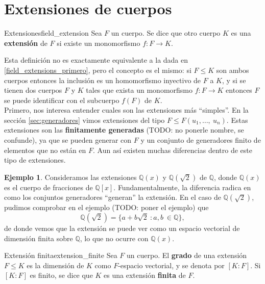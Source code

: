 \documentclass[a4paper]{book}
\theoremstyle{definition}
\theoremstyle{ejemplo}
\newtheorem{ejem}{Ejemplo}[section]
\theoremstyle{demostracion}
\newcommand{\racionales}{\mathbb{Q}}
\begin{document}
\section{Extensiones de cuerpos}
\begin{define}{Extensiones}{field_extension}
	Sea $F$ un cuerpo. Se dice que otro cuerpo $K$ es una \textbf{extensión} de $F$ si existe un monomorfismo $f: F \rightarrow K$.
\end{define}
Esta definición no es exactamente equivalente a la dada en \eqref{field_extensions_primero}, pero el concepto es el mismo: si $F \leq K$ son ambos cuerpos entonces la inclusión es un homomorfismo inyectivo de $F$ a $K$, y si se tienen dos cuerpos $F$ y $K$ tales que exista un monomorfismo $f: F \rightarrow K$ entonces $F$ se puede identificar con el subcuerpo $f(F)$ de $K$.\\ 
Primero, nos interesa entender cuales son las extensiones más ``simples''. En la sección \eqref{sec:generadores} vimos extensiones del tipo $F \leq F(u_1, \ldots,\ u_n)$. Estas extensiones son las \textbf{finitamente generadas} (TODO: no ponerle nombre, se confunde), ya que se pueden generar con $F$ y un conjunto de generadores finito de elementos que no están en $F$. Aun así existen muchas diferencias dentro de este tipo de extensiones.

\begin{ejem}
Consideramos las extensiones $\racionales(x)$ y $\racionales(\sqrt{2})$ de $\racionales$, donde $\racionales(x)$ es el cuerpo de fracciones de $\racionales[x]$. Fundamentalmente, la diferencia radica en como los conjuntos generadores ``generan'' la extensión. En el caso de $\racionales(\sqrt{2})$, pudimos comprobar en el ejemplo (TODO: poner el ejemplo) que
\begin{equation*}
	\racionales(\sqrt{2}) = \{ a + b\sqrt{2}\ : a,b\ \in \racionales\},
\end{equation*}
de donde vemos que la extensión se puede ver como un espacio vectorial de dimensión finita sobre $\racionales$, lo que no ocurre con $\racionales(x)$.
\end{ejem}

\begin{define}{Extensión finita}{extension_finite}
	Sea $F$ un cuerpo. El \textbf{grado} de una extensión $F \leq K$ es la dimensión de $K$ como $F$-espacio vectorial, y se denota por $[K:F]$. Si $[K:F]$ es finito, se dice que $K$ es una extensión \textbf{finita} de $F$.
\end{define}
\end{document}

